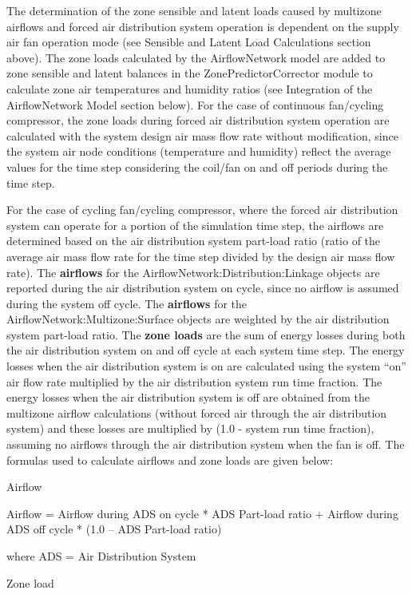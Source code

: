 The determination of the zone sensible and latent loads caused by multizone airflows and forced air distribution system operation is dependent on the supply air fan operation mode (see Sensible and Latent Load Calculations section above). The zone loads calculated by the AirflowNetwork model are added to zone sensible and latent balances in the ZonePredictorCorrector module to calculate zone air temperatures and humidity ratios (see Integration of the AirflowNetwork Model section below). For the case of continuous fan/cycling compressor, the zone loads during forced air distribution system operation are calculated with the system design air mass flow rate without modification, since the system air node conditions (temperature and humidity) reflect the average values for the time step considering the coil/fan on and off periods during the time step.

For the case of cycling fan/cycling compressor, where the forced air distribution system can operate for a portion of the simulation time step, the airflows are determined based on the air distribution system part-load ratio (ratio of the average air mass flow rate for the time step divided by the design air mass flow rate). The \textbf{airflows} for the AirflowNetwork:Distribution:Linkage objects are reported during the air distribution system on cycle, since no airflow is assumed during the system off cycle. The \textbf{airflows} for the AirflowNetwork:Multizone:Surface objects are weighted by the air distribution system part-load ratio. The \textbf{zone loads} are the sum of energy losses during both the air distribution system on and off cycle at each system time step. The energy losses when the air distribution system is on are calculated using the system ``on'' air flow rate multiplied by the air distribution system run time fraction. The energy losses when the air distribution system is off are obtained from the multizone airflow calculations (without forced air through the air distribution system) and these losses are multiplied by (1.0 - system run time fraction), assuming no airflows through the air distribution system when the fan is off. The formulas used to calculate airflows and zone loads are given below:

Airflow

Airflow = Airflow during ADS on cycle * ADS Part-load ratio + Airflow during ADS off cycle * (1.0 -- ADS Part-load ratio)

where ADS = Air Distribution System

Zone load

